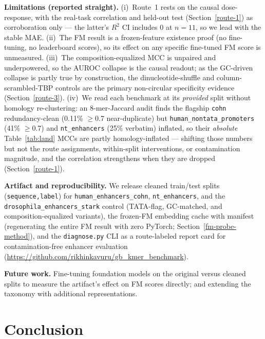 \documentclass{ws-procs11x85}
\begin{document}
\textbf{Limitations (reported straight).} (i)~Route~1 rests on the causal dose-response, with the
real-task correlation and held-out test (Section~\ref{route-1}) as corroboration only --- the latter's
$R^2$ CI includes 0 at $n{=}11$, so we lead with the stable MAE. (ii)~The FM
result is a frozen-feature existence proof (no fine-tuning, no leaderboard scores), so its effect on any
specific fine-tuned FM score is unmeasured. (iii)~The
composition-equalized MCC is unpaired and underpowered, so the AUROC collapse is the causal readout; as the
GC-driven collapse is partly true by construction, the dinucleotide-shuffle and column-scrambled-TBP
controls are the primary non-circular specificity evidence (Section~\ref{route-3}). (iv)~We read each benchmark at its \emph{provided} split without homology
re-clustering: an $8$-mer-Jaccard audit finds the flagship \texttt{cohn} redundancy-clean (0.11\%
$\ge$0.7 near-duplicate) but \texttt{human\_nontata\_promoters} (41\% $\ge$0.7) and \texttt{nt\_enhancers}
(25\% verbatim) inflated, so their \emph{absolute} Table~\ref{tab:land} MCCs are partly homology-inflated
--- shifting those numbers but not the route assignments, within-split interventions, or contamination
magnitude, and the correlation strengthens when they are dropped (Section~\ref{route-1}).

\textbf{Artifact and reproducibility.} We release cleaned train/test splits (\texttt{sequence,label}) for
\texttt{human\_enhancers\_cohn}, \texttt{nt\_enhancers}, and the \texttt{drosophila\_enhancers\_stark}
control (TATA-flag, GC-matched, and composition-equalized variants), the frozen-FM embedding cache with
manifest (regenerating the entire FM result with zero PyTorch; Section~\ref{fm-probe-method}), and the
\texttt{diagnose.py} CLI as a route-labeled report card for contamination-free enhancer evaluation
(\url{https://github.com/rikhinkavuru/gb_kmer_benchmark}).

\textbf{Future work.} Fine-tuning foundation models on the original versus cleaned splits to measure the
artifact's effect on FM scores directly; and extending the taxonomy with additional representations.

\section{Conclusion}\label{conclusion}
\end{document}

